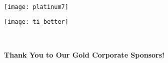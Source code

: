 \documentclass[twoside]{article}
\begin{document}
\begin{center}
        \\
            \begin{minipage}{0.45\textwidth}\begin{center}\vfill\begin{adjustbox}{max size={!}{0.175\textheight}}\texttt{[image: platinum7]}\end{adjustbox}\vfill\end{center}\end{minipage}
        \hspace{2em}\begin{minipage}{0.45\textwidth}\begin{center}\vfill\begin{adjustbox}{max size={!}{0.175\textheight}}\texttt{[image: ti\_better]}\end{adjustbox}\vfill\end{center}\end{minipage}
        \\
            \end{center}
    { \fontsize{16}{19}\selectfont \bf Thank You to Our Gold Corporate Sponsors!}
\end{document}

